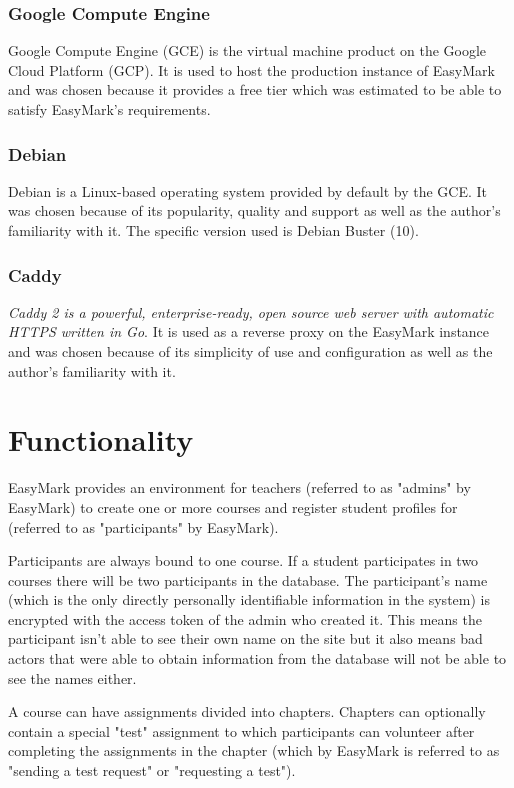 \documentclass[12pt,a4paper,oneside]{report}
\begin{document}
	\subsubsection{Google Compute Engine} \label{subsubsec:googlecomputeengine}
	Google Compute Engine (GCE) is the virtual machine product on the Google Cloud Platform (GCP)\parencite{gcewebsite}. It is used to host the production instance of EasyMark and was chosen because it provides a free tier which was estimated to be able to satisfy EasyMark's requirements.

	\subsubsection{Debian} \label{subsubsec:debian}
	Debian is a Linux-based operating system\parencite{aboutdebian} provided by default by the GCE. It was chosen because of its popularity, quality and support as well as the author's familiarity with it. The specific version used is Debian Buster (10).

	\subsubsection{Caddy} \label{subsubsec:caddy}
	\emph{Caddy 2 is a powerful, enterprise-ready, open source web server with automatic HTTPS written in Go}\parencite{caddywebsite}. It is used as a reverse proxy on the EasyMark instance and was chosen because of its simplicity of use and configuration as well as the author's familiarity with it.

	\section{Functionality}
	EasyMark provides an environment for teachers (referred to as "admins" by EasyMark) to create one or more courses and register student profiles for (referred to as "participants" by EasyMark).

	Participants are always bound to one course. If a student participates in two courses there will be two participants in the database. The participant's name (which is the only directly personally identifiable information in the system) is encrypted with the access token of the admin who created it. This means the participant isn't able to see their own name on the site but it also means bad actors that were able to obtain information from the database will not be able to see the names either.

	\pagebreak
	A course can have assignments divided into chapters. Chapters can optionally contain a special "test" assignment to which participants can volunteer after completing the assignments in the chapter (which by EasyMark is referred to as "sending a test request" or "requesting a test").
\end{document}
